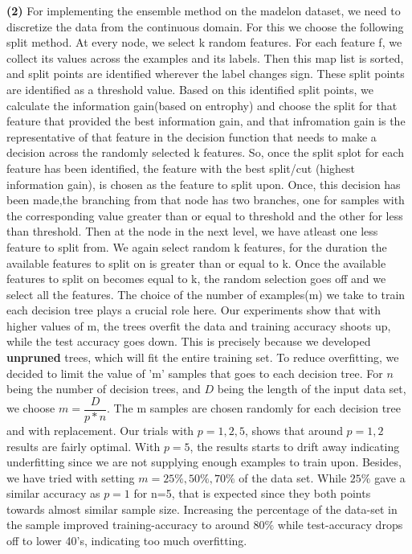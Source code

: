 \documentclass{article}
\renewcommand\part[1]{\vspace{.10in}\textbf{(#1)}}
\begin{document}
  \part{2} For implementing the ensemble method on the madelon dataset, we need to discretize the data from the continuous domain. For this we choose the following split method. At every node, we select k random features. For each feature f, we collect its values across the examples and its labels. Then this map list is sorted, and split points are identified wherever the label changes sign. These split points are identified as a threshold value. Based on this identified split points, we calculate the information gain(based on entrophy) and choose the split for that feature that provided the best information gain, and that infromation gain is the representative of that feature in the decision function that needs to make a decision across the randomly selected k features.  So, once the split splot for each feature has been identified, the feature with the best split/cut (highest information gain), is chosen as the feature to split upon. Once, this decision  has been made,the branching from that node has two branches, one for samples with the corresponding value greater than or equal to threshold and the other for less than threshold. Then at the node in the next level, we have atleast one less feature to split from. We again select random k features, for the duration the available features to split on is greater than or equal to k. Once the available features to split on becomes equal to k, the random selection goes off and we select all the features. \newline
  The choice of the number of examples(m) we take to train each decision tree plays a crucial role here. Our experiments show that with higher values of m, the trees overfit the data and training accuracy shoots up, while the test accuracy goes down. This is precisely because we developed \textbf {unpruned} trees, which will fit the entire training set. To reduce overfitting, we decided to limit the value of 'm' samples that goes to each decision tree. For $n$ being the number of decision trees, and $D$ being the length of the input data set, we choose $m = \dfrac{D}{p*n}$. The m samples are chosen randomly for each decision tree and with replacement. Our trials with $p=1,2,5$, shows that around $p=1,2$ results are fairly optimal. With $p=5$, the results starts to drift away indicating underfitting since we are not supplying enough examples to train upon. Besides, we have tried with setting $m={25\%, 50\%, 70\%}$ of the data set. While $25\%$ gave a similar accuracy as $p=1$ for n=5, that is expected since they both points towards almost similar sample size. Increasing the percentage of the data-set in the sample improved training-accuracy to around $80\%$ while test-accuracy drops off to lower 40's, indicating too much overfitting. \newline
\end{document}
